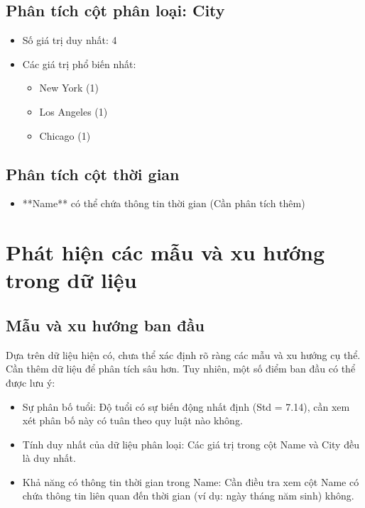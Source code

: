 \documentclass[12pt]{article}
\begin{document}
\subsection{Phân tích cột phân loại: City}
\begin{itemize}
    \item Số giá trị duy nhất: 4
    \item Các giá trị phổ biến nhất:
    \begin{itemize}
        \item New York (1)
        \item Los Angeles (1)
        \item Chicago (1)
    \end{itemize}
\end{itemize}

\subsection{Phân tích cột thời gian}
\begin{itemize}
    \item **Name** có thể chứa thông tin thời gian (Cần phân tích thêm)
\end{itemize}

\section{Phát hiện các mẫu và xu hướng trong dữ liệu}

\subsection{Mẫu và xu hướng ban đầu}

Dựa trên dữ liệu hiện có, chưa thể xác định rõ ràng các mẫu và xu hướng cụ thể. Cần thêm dữ liệu để phân tích sâu hơn. Tuy nhiên, một số điểm ban đầu có thể được lưu ý:

\begin{itemize}
    \item Sự phân bố tuổi: Độ tuổi có sự biến động nhất định (Std = 7.14), cần xem xét phân bố này có tuân theo quy luật nào không.
    \item Tính duy nhất của dữ liệu phân loại: Các giá trị trong cột Name và City đều là duy nhất.
    \item Khả năng có thông tin thời gian trong Name: Cần điều tra xem cột Name có chứa thông tin liên quan đến thời gian (ví dụ: ngày tháng năm sinh) không.
\end{itemize}
\end{document}
